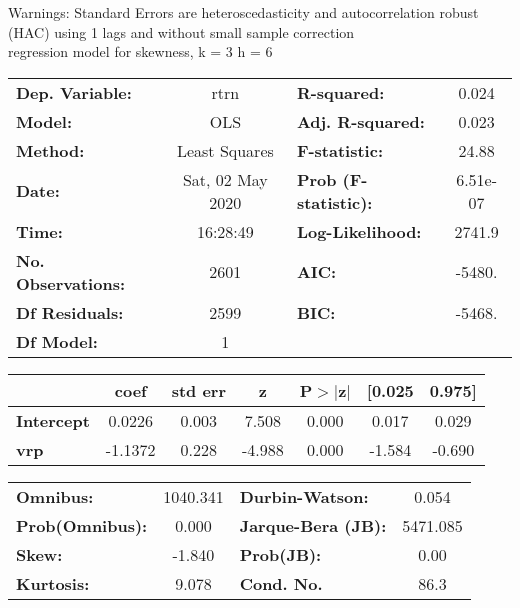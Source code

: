 Warnings: \newline
 [1] Standard Errors are heteroscedasticity and autocorrelation robust (HAC) using 1 lags and without small sample correction\\ 

regression model for skewness, k = 3 h = 6\begin{center}
\begin{tabular}{lclc}
\toprule
\textbf{Dep. Variable:}    &       rtrn       & \textbf{  R-squared:         } &     0.024   \\
\textbf{Model:}            &       OLS        & \textbf{  Adj. R-squared:    } &     0.023   \\
\textbf{Method:}           &  Least Squares   & \textbf{  F-statistic:       } &     24.88   \\
\textbf{Date:}             & Sat, 02 May 2020 & \textbf{  Prob (F-statistic):} &  6.51e-07   \\
\textbf{Time:}             &     16:28:49     & \textbf{  Log-Likelihood:    } &    2741.9   \\
\textbf{No. Observations:} &        2601      & \textbf{  AIC:               } &    -5480.   \\
\textbf{Df Residuals:}     &        2599      & \textbf{  BIC:               } &    -5468.   \\
\textbf{Df Model:}         &           1      & \textbf{                     } &             \\
\bottomrule
\end{tabular}
\begin{tabular}{lcccccc}
                   & \textbf{coef} & \textbf{std err} & \textbf{z} & \textbf{P$> |$z$|$} & \textbf{[0.025} & \textbf{0.975]}  \\
\midrule
\textbf{Intercept} &       0.0226  &        0.003     &     7.508  &         0.000        &        0.017    &        0.029     \\
\textbf{vrp}       &      -1.1372  &        0.228     &    -4.988  &         0.000        &       -1.584    &       -0.690     \\
\bottomrule
\end{tabular}
\begin{tabular}{lclc}
\textbf{Omnibus:}       & 1040.341 & \textbf{  Durbin-Watson:     } &    0.054  \\
\textbf{Prob(Omnibus):} &   0.000  & \textbf{  Jarque-Bera (JB):  } & 5471.085  \\
\textbf{Skew:}          &  -1.840  & \textbf{  Prob(JB):          } &     0.00  \\
\textbf{Kurtosis:}      &   9.078  & \textbf{  Cond. No.          } &     86.3  \\
\bottomrule
\end{tabular}
\end{center}

